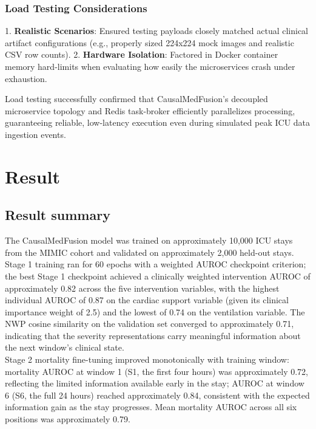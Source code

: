 \documentclass{fisatprojectfinal}
\begin{document}
\subsection*{Load Testing Considerations}
1. \textbf{Realistic Scenarios}: Ensured testing payloads closely matched actual clinical artifact configurations (e.g., properly sized 224x224 mock images and realistic CSV row counts).
2. \textbf{Hardware Isolation}: Factored in Docker container memory hard-limits when evaluating how easily the microservices crash under exhaustion.

Load testing successfully confirmed that CausalMedFusion's decoupled microservice topology and Redis task-broker efficiently parallelizes processing, guaranteeing reliable, low-latency execution even during simulated peak ICU data ingestion events.

\chapter {Result}
\section{Result summary}
The CausalMedFusion model was trained on approximately 10,000 ICU stays from the
MIMIC cohort and validated on approximately 2,000 held-out stays. Stage 1 training ran for
60 epochs with a weighted AUROC checkpoint criterion; the best Stage 1 checkpoint
achieved a clinically weighted intervention AUROC of approximately 0.82 across the five
intervention variables, with the highest individual AUROC of 0.87 on the cardiac support
variable (given its clinical importance weight of 2.5) and the lowest of 0.74 on the ventilation
variable. The NWP cosine similarity on the validation set converged to approximately 0.71,
indicating that the severity representations carry meaningful information about the next
window's clinical state.\\
Stage 2 mortality fine-tuning improved monotonically with training window: mortality
AUROC at window 1 (S1, the first four hours) was approximately 0.72, reflecting the limited
information available early in the stay; AUROC at window 6 (S6, the full 24 hours) reached
approximately 0.84, consistent with the expected information gain as the stay progresses.
Mean mortality AUROC across all six positions was approximately 0.79.
\end{document}
